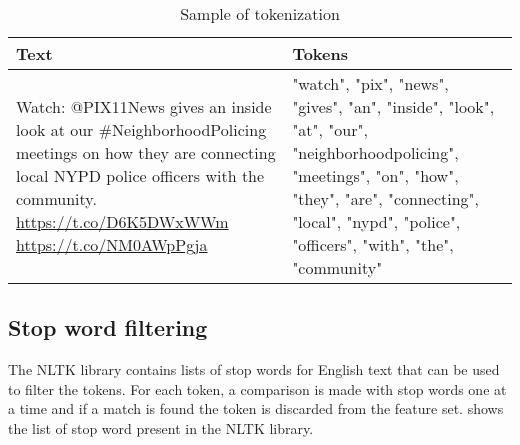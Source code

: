\begin{table}[h]
\begin{center}
\caption{Sample of tokenization}
\label{tbl:tokenization_sample}
\begin{tabular}{p{8cm}p{5cm}}
\toprule 
Text&Tokens\\
\midrule 
Watch: @PIX11News  gives an inside look at our \#NeighborhoodPolicing
meetings on how they are connecting local NYPD police officers with
the community. \url{https://t.co/D6K5DWxWWm} \url{https://t.co/NM0AWpPgja} & "watch", "pix", "news", "gives", "an", "inside", "look", "at", "our", "neighborhoodpolicing", "meetings", "on", "how", "they", "are", "connecting", "local", "nypd", "police", "officers", "with", "the", "community" \\
\bottomrule
\end{tabular}
\end{center}
\end{table}

\subsection{Stop word filtering}
The NLTK library contains lists of stop words for English text that can be used to filter the tokens. For each token, a comparison is made with stop words one at a time and if a match is found the token is discarded from the feature set.  shows the list of stop word present in the NLTK library.

